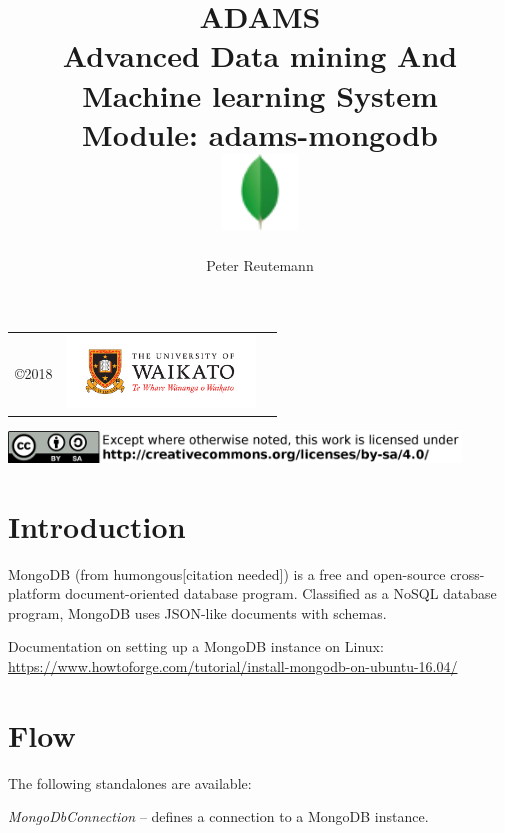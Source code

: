 \documentclass[a4paper]{book}
\title{
  \textbf{ADAMS} \\
  {\Large \textbf{A}dvanced \textbf{D}ata mining \textbf{A}nd \textbf{M}achine
  learning \textbf{S}ystem} \\
  {\Large Module: adams-mongodb} \\
  \vspace{1cm}
  \includegraphics[width=2cm]{images/mongodb-module.png} \\
}
\author{
  Peter Reutemann
}
\begin{document}
\begin{titlepage}
\maketitle

\thispagestyle{empty}
\center
\begin{table}[b]
	\begin{tabular}{c l l}
		\parbox[c][2cm]{2cm}{\copyright 2018} &
		\parbox[c][2cm]{5cm}{\includegraphics[width=5cm]{images/coat_of_arms.pdf}} \\
	\end{tabular}
	\includegraphics[width=12cm]{images/cc.png} \\
\end{table}

\end{titlepage}

\tableofcontents

\chapter{Introduction}
MongoDB (from humongous[citation needed]) is a free and open-source cross-platform
document-oriented database program. Classified as a NoSQL\cite{nosql} database program,
MongoDB uses JSON-like\cite{json} documents with schemas.

Documentation on setting up a MongoDB instance on Linux: \\
\url{https://www.howtoforge.com/tutorial/install-mongodb-on-ubuntu-16.04/}{}

\chapter{Flow}
The following standalones are available:
\begin{tight_itemize}
  \item \textit{MongoDbConnection} -- defines a connection to a MongoDB instance.
\end{tight_itemize}
\end{document}
